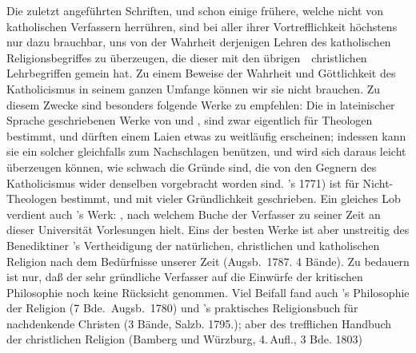 \begin{aufza}
\begin{aufzb}
\item Die zuletzt angeführten Schriften, und schon einige frühere, welche nicht von katholischen Verfassern herrühren, sind bei aller ihrer Vortrefflichkeit höchstens nur dazu brauchbar, uns von der Wahrheit derjenigen Lehren des katholischen Religionsbegriffes zu überzeugen, die dieser mit den übrigen~\ christlichen Lehrbegriffen gemein hat. Zu einem Beweise der Wahrheit und Göttlichkeit des Katholicismus in seinem ganzen Umfange können wir sie nicht brauchen. Zu diesem Zwecke sind besonders folgende Werke zu empfehlen: Die in lateinischer Sprache geschriebenen Werke von   und , sind zwar eigentlich für Theologen bestimmt, und dürften einem Laien etwas zu weitläufig erscheinen; indessen kann sie ein solcher gleichfalls zum Nachschlagen benützen, und wird sich daraus leicht überzeugen können, wie schwach die Gründe sind, die von den Gegnern des Katholicismus wider denselben vorgebracht worden sind. 's  1771) ist für Nicht-Theologen bestimmt, und mit vieler Gründlichkeit geschrieben. Ein gleiches Lob verdient auch 's Werk: , nach welchem Buche der Verfasser zu seiner Zeit an dieser Universität Vorlesungen hielt. Eins der besten Werke ist aber unstreitig des Benediktiner 's Vertheidigung der natürlichen, christlichen und katholischen Religion nach dem Bedürfnisse unserer Zeit (Augsb.~1787. 4 Bände). Zu bedauern ist nur, daß der sehr gründliche Verfasser auf die Einwürfe der kritischen Philosophie noch keine Rücksicht genommen. Viel Beifall fand auch 's Philosophie der Religion (7 Bde.\ Augsb.~1780) und 's praktisches Religionsbuch für nachdenkende Christen (3 Bände, Salzb. 1795.); aber des trefflichen  Handbuch der christlichen Religion (Bamberg und Würzburg, 4.\,Aufl., 3 Bde. 1803)

\end{aufzb}
\end{aufza}
